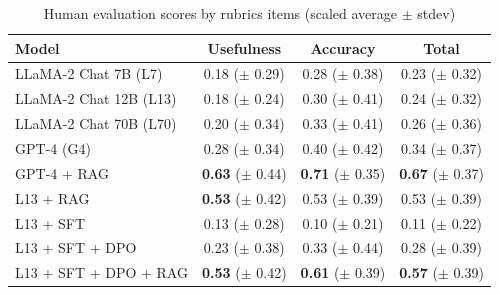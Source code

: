 
\begin{table}[h!]
\centering
    \caption{Human evaluation scores by rubrics items (scaled average $\pm$ stdev)}
    \label{tab:human-eval}
    \begin{tabular}{l|c|c|c}
        \toprule
        \textbf{Model} & \textbf{Usefulness} & \textbf{Accuracy} & \textbf{Total} \\
        \midrule
        LLaMA-2 Chat 7B (L7) & 0.18 ($\pm$ 0.29) & 0.28 ($\pm$ 0.38) & 0.23 ($\pm$ 0.32) \\
        LLaMA-2 Chat 12B (L13) & 0.18 ($\pm$ 0.24) & 0.30 ($\pm$ 0.41) & 0.24 ($\pm$ 0.32) \\
        LLaMA-2 Chat 70B (L70) & 0.20 ($\pm$ 0.34) & 0.33 ($\pm$ 0.41) & 0.26 ($\pm$ 0.36) \\
        GPT-4 (G4) & 0.28 ($\pm$ 0.34) & 0.40 ($\pm$ 0.42) & 0.34 ($\pm$ 0.37) \\
        GPT-4 + RAG & \textbf{0.63} ($\pm$ 0.44) & \textbf{0.71} ($\pm$ 0.35) & \textbf{0.67} ($\pm$ 0.37) \\
        L13 + RAG & \textbf{0.53} ($\pm$ 0.42) & 0.53 ($\pm$ 0.39) & 0.53 ($\pm$ 0.39) \\
        L13 + SFT & 0.13 ($\pm$ 0.28) & 0.10 ($\pm$ 0.21) & 0.11 ($\pm$ 0.22) \\
        L13 + SFT + DPO & 0.23 ($\pm$ 0.38) & 0.33 ($\pm$ 0.44) & 0.28 ($\pm$ 0.39) \\
        L13 + SFT + DPO + RAG & \textbf{0.53} ($\pm$ 0.42) & \textbf{0.61} ($\pm$ 0.39) & \textbf{0.57} ($\pm$ 0.39) \\
        \bottomrule
    \end{tabular}
\end{table}

